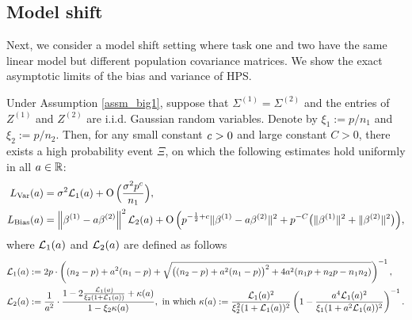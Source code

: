 \subsection{Model shift}\label{sec_sizeratio}

Next, we consider a model shift setting where task one and two have the same linear model but different population covariance matrices.
We show the exact asymptotic limits of the bias and variance of HPS.

\begin{theorem}\label{cor_MTL_loss}
Under Assumption \ref{assm_big1}, suppose that $\Sigma^{(1)}=\Sigma^{(2)}$ and the entries of $Z^{(1)}$ and $Z^{(2)}$ are i.i.d. Gaussian random variables.
Denote by $\xi_1:=p/n_1$ and $\xi_2:=p/n_2$.
Then, for any small constant ${\mathit{c}}>0$ and large constant $C>0$, there exists a high probability event $\Xi$, on which the following estimates hold uniformly in all $a\in \mathbb{R}$:
\begin{align}
L_{\var}(a) &= \sigma^2  \cal L_1(a)+ \OO\Big(\frac {\sigma^2 p^{c}} {n_1}\Big), \label{Lvar_samplesize} \\
L_{\bias}(a)&= \bignorm{\beta^{(1)}-a\beta^{(2)}}^2 \cal L_2(a) +  \OO\Big(p^{-\frac 1 2 + c}  \norm{\beta^{(1)}-a\beta^{(2)}}^2
+ p^{-C}\big( \|\beta^{(1)} \|^2  +  \|\beta^{(2)} \|^2\big)   \Big),\label{Lbias_samplesize}
\end{align}
where $\mathcal{L}_1(a)$ and $\mathcal{L}_2(a)$ are defined as follows
\begin{align*}
\cal L_1(a) &:= {2p}\cdot\left((n_2 - p) + a^2 (n_1 - p) + \sqrt{\big( (n_2 - p) + a^2 (n_1 - p)\big)^2 + 4a^2(n_1 p + n_2 p - n_1 n_2)}\right)^{-1}, \\
\cal L_2(a) &:= \frac1{a^2}\cdot \frac{1- 2\frac{\cal L_1(a)}{\xi_2(1 + \cal L_1(a))} + \kappa(a)}{1- \xi_2 \kappa(a)}, \text{ in which }
\kappa(a) := \frac{\cal L_1(a)^2}{\xi_2^2(1+\cal L_1(a))^2}  \left(1 - \frac{a^4 \cal L_1(a)^2 }{\xi_1(1+a^2\cal L_1(a) )^2}\right)^{-1}.
 \end{align*}

\end{theorem}
